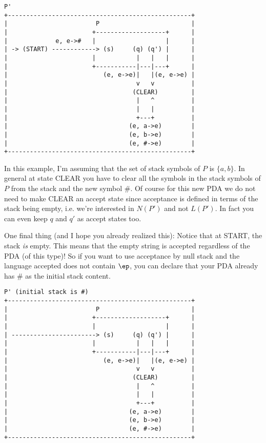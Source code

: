 \begin{samepage}
\begin{verbatim}
P'
+--------------------------------------------------+
|                        P                         |
|                       +-------------------+      |
|             e, e->#   |                   |      |
| -> (START) ------------> (s)     (q) (q') |      |
|                       |           |   |   |      |
|                       +-----------|---|---+      |
|                          (e, e->e)|   |(e, e->e) |
|                                   v   v          |
|                                  (CLEAR)         |
|                                   |   ^          |
|                                   |   |          |
|                                   +---+          |
|                                 (e, a->e)        |
|                                 (e, b->e)        |
|                                 (e, #->e)        |
+--------------------------------------------------+
\end{verbatim}
\end{samepage}

In this example, I'm assuming that the set of stack symbols of $P$ is
$\{a, b\}$.
In general at state CLEAR you have to clear all the symbols in the stack
symbols of $P$ from the stack and the new symbol \#.
Of course for this new PDA we do not need to make CLEAR an accept state since
acceptance is defined in terms of the stack being empty, i.e. we're
interested in $N(P')$ and not $L(P')$.
In fact you can even keep $q$ and $q'$ as accept states too.

One final thing (and I hope you already realized this): 
Notice that at START, the stack \textit{ is} empty.
This means that the empty string is accepted regardless of the PDA (of this
type)!
So if you want to use acceptance by null stack and the language accepted
does not contain $\ep$, you can declare that your PDA already has \# as the 
initial stack content.

\begin{samepage}
\begin{verbatim}
P' (initial stack is #)
+--------------------------------------------------+
|                        P                         |
|                       +-------------------+      |
|                       |                   |      |
| -----------------------> (s)     (q) (q') |      |
|                       |           |   |   |      |
|                       +-----------|---|---+      |
|                          (e, e->e)|   |(e, e->e) |
|                                   v   v          |
|                                  (CLEAR)         |
|                                   |   ^          |
|                                   |   |          |
|                                   +---+          |
|                                 (e, a->e)        |
|                                 (e, b->e)        |
|                                 (e, #->e)        |
+--------------------------------------------------+
\end{verbatim}
\end{samepage}

